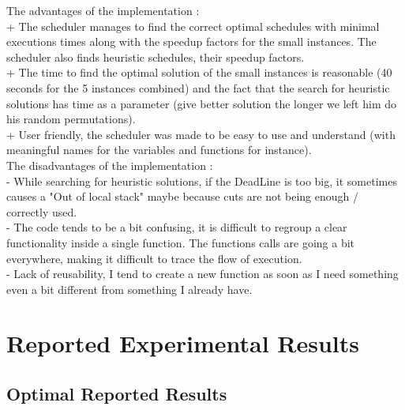 \documentclass[11pt, a4paper, margin = 1.3cm]{article}
\begin{document}
The advantages of the implementation : \\
+ The scheduler manages to find the correct optimal schedules with minimal executions times along with the speedup factors for the small instances. The scheduler also finds heuristic schedules, their speedup factors. \\
+ The time to find the optimal solution of the small instances is reasonable (40 seconds for the 5 instances combined) and the fact that the search for heuristic solutions has time as a parameter (give better solution the longer we left him do his random permutations). \\
+ User friendly, the scheduler was made to be easy to use and understand (with meaningful names for the variables and functions for instance). \\

\noindent The disadvantages of the implementation : \\
- While searching for heuristic solutions, if the DeadLine is too big, it sometimes causes a "Out of local stack" maybe because cuts are not being enough / correctly used. \\
- The code tends to be a bit confusing, it is difficult to regroup a clear functionality inside a single function. The functions calls are going a bit everywhere, making it difficult to trace the flow of execution. \\
- Lack of reusability, I tend to create a new function as soon as I need something even a bit different from something I already have.

\section{Reported Experimental Results}

\subsection{Optimal Reported Results}
\end{document}
